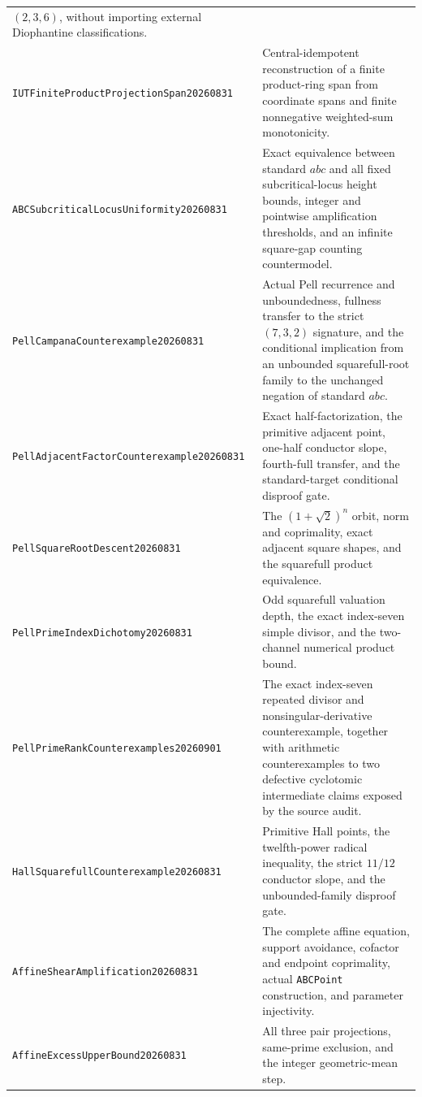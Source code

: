 \documentclass[11pt]{amsart}
\theoremstyle{definition}
\theoremstyle{remark}
\begin{document}
\begin{longtable}{>{\raggedright\arraybackslash}p{}>{\raggedright\arraybackslash}p{}}
$(2,3,6)$, without importing external Diophantine classifications.\\[3pt]
\texttt{IUTFiniteProductProjection\allowbreak Span20260831} & Central-idempotent
reconstruction of a finite product-ring span from coordinate spans and
finite nonnegative weighted-sum monotonicity.\\
\texttt{ABCSubcriticalLocus\allowbreak Uniformity20260831} & Exact equivalence
between standard $abc$ and all fixed subcritical-locus height bounds,
integer and pointwise amplification thresholds, and an infinite
square-gap counting countermodel.\\[3pt]
\texttt{PellCampana\allowbreak Counterexample20260831} & Actual Pell
recurrence and unboundedness, fullness transfer to the strict $(7,3,2)$
signature, and the conditional implication from an unbounded squarefull-root
family to the unchanged negation of standard $abc$.\\[3pt]
\texttt{PellAdjacentFactor\allowbreak Counterexample20260831} & Exact
half-factorization, the primitive adjacent point, one-half conductor slope,
fourth-full transfer, and the standard-target conditional disproof gate.\\[3pt]
\texttt{PellSquareRoot\allowbreak Descent20260831} & The
$(1+\sqrt2)^n$ orbit, norm and coprimality, exact adjacent square shapes,
and the squarefull product equivalence.\\[3pt]
\texttt{PellPrimeIndex\allowbreak Dichotomy20260831} & Odd squarefull
valuation depth, the exact index-seven simple divisor, and the two-channel
numerical product bound.\\[3pt]
\texttt{PellPrimeRank\allowbreak Counterexamples20260901} & The exact
index-seven repeated divisor and nonsingular-derivative counterexample,
together with arithmetic counterexamples to two defective cyclotomic
intermediate claims exposed by the source audit.\\[3pt]
\texttt{HallSquarefull\allowbreak Counterexample20260831} & Primitive Hall
points, the twelfth-power radical inequality, the strict $11/12$ conductor
slope, and the unbounded-family disproof gate.\\[3pt]
\texttt{AffineShear\allowbreak Amplification20260831} & The complete affine
equation, support avoidance, cofactor and endpoint coprimality, actual
\texttt{ABCPoint} construction, and parameter injectivity.\\[3pt]
\texttt{AffineExcess\allowbreak UpperBound20260831} & All three pair
projections, same-prime exclusion, and the integer geometric-mean step.\\[3pt]

\end{longtable}
\end{document}
